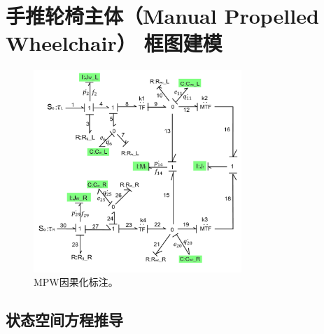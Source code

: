 \clearpage
\section{手推轮椅主体（Manual Propelled Wheelchair） 框图建模}

\begin{figure}[h]
	\centering
	\includegraphics[width=0.7\textwidth]{fig/MPW.png}
	\caption{MPW因果化标注。}\label{fig:mdm}
\end{figure}

\subsection{状态空间方程推导}

